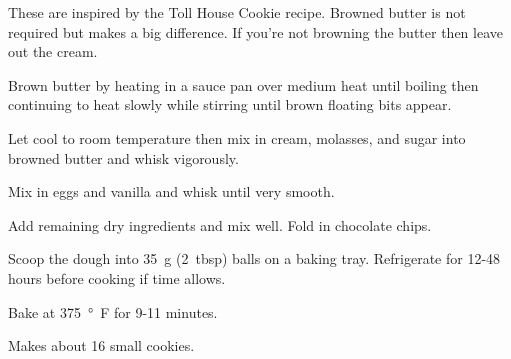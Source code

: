 
These are inspired by the Toll House Cookie recipe. Browned butter is not required but makes a big difference. If you're not browning the butter then leave out the cream.


Brown butter by heating in a sauce pan over medium heat until boiling then continuing to heat slowly while stirring until brown floating bits appear.

\begin{ingredients}
\end{ingredients}

Let cool to room temperature then mix in cream, molasses, and sugar into browned butter and whisk vigorously.

\begin{ingredients}
\end{ingredients}

Mix in eggs and vanilla and whisk until very smooth.

\begin{ingredients}
\end{ingredients}

Add remaining dry ingredients and mix well. Fold in chocolate chips.

\begin{ingredients}
\end{ingredients}

Scoop the dough into \SI{35}{g} (\SI{2}{tbsp}) balls on a baking tray. Refrigerate for 12-48 hours before cooking if time allows.

Bake at \SI{375}{°F} for 9-11 minutes.

Makes about 16 small cookies.
